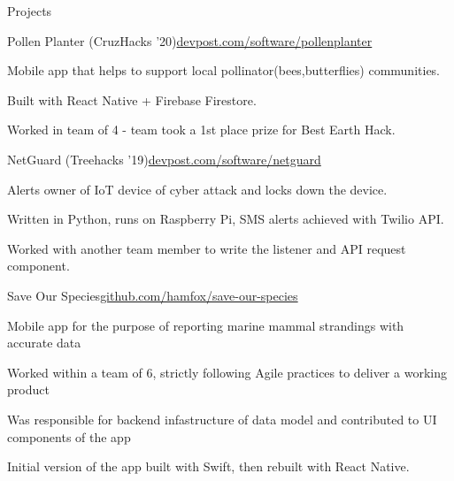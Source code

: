 \documentclass{resume} %
\begin{document}

\begin{rSection}{Projects}

\begin{rSubsection}{Pollen Planter (CruzHacks '20)}{\href{https://www.devpost.com/software/pollenplanter}{devpost.com/software/pollenplanter}}{}{}
    \item Mobile app that helps to support local pollinator(bees,butterflies) communities.
    \item Built with React Native + Firebase Firestore.
    \item Worked in team of 4 - team took a 1st place prize for Best Earth Hack.
\end{rSubsection}

\begin{rSubsection}{NetGuard (Treehacks '19)}{\href{https://www.devpost.com/software/netguard}{devpost.com/software/netguard}}{}{}
    \item Alerts owner of IoT device of cyber attack and locks down the device.
    \item Written in Python, runs on Raspberry Pi, SMS alerts achieved with Twilio API.
    \item Worked with another team member to write the listener and API request component.
\end{rSubsection}

\begin{rSubsection}{Save Our Species}{\href{https://github.com/hamfox/save-our-species}{github.com/hamfox/save-our-species}}{}{}
    \item Mobile app for the purpose of reporting marine mammal strandings with accurate data
    \item Worked within a team of 6, strictly following Agile practices to deliver a working product 
    \item Was responsible for backend infastructure of data model and contributed to UI components of the app
    \item Initial version of the app built with Swift, then rebuilt with React Native.
\end{rSubsection}

\end{rSection}


\end{document}
